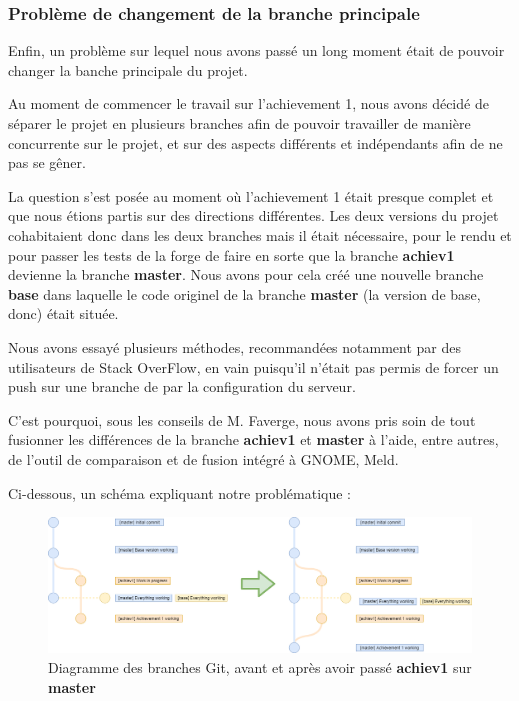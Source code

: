 \documentclass{article}
\begin{document}

\subsubsection{Problème de changement de la branche principale}
\label{subsct:probleme_changement_branch}

Enfin, un problème sur lequel nous avons passé un long moment était de pouvoir changer la banche principale du projet.

Au moment de commencer le travail sur l'achievement 1, nous avons décidé de séparer le projet en plusieurs branches afin de pouvoir travailler de manière concurrente sur le projet, et sur des aspects différents et indépendants afin de ne pas se gêner.

La question s'est posée au moment où l'achievement 1 était presque complet et que nous étions partis sur des directions différentes. Les deux versions du projet cohabitaient donc dans les deux branches mais il était nécessaire, pour le rendu et pour passer les tests de la forge de faire en sorte que la branche \textbf{achiev1} devienne la branche \textbf{master}. Nous avons pour cela créé une nouvelle branche \textbf{base} dans laquelle le code originel de la branche \textbf{master} (la version de base, donc) était située.

Nous avons essayé plusieurs méthodes, recommandées notamment par des utilisateurs de Stack OverFlow, en vain puisqu'il n'était pas permis de forcer un push sur une branche de par la configuration du serveur.

C'est pourquoi, sous les conseils de M. Faverge, nous avons pris soin de tout fusionner les différences de la branche \textbf{achiev1} et \textbf{master} à l'aide, entre autres, de l'outil de comparaison et de fusion intégré à GNOME, Meld.

Ci-dessous, un schéma expliquant notre problématique :

\begin{figure}[ht!]
\centering
\includegraphics[scale=0.28]{branches.png}
\caption{Diagramme des branches Git, avant et après avoir passé \textbf{achiev1} sur \textbf{master}}
\label{fig:branches}
\end{figure}
\end{document}
